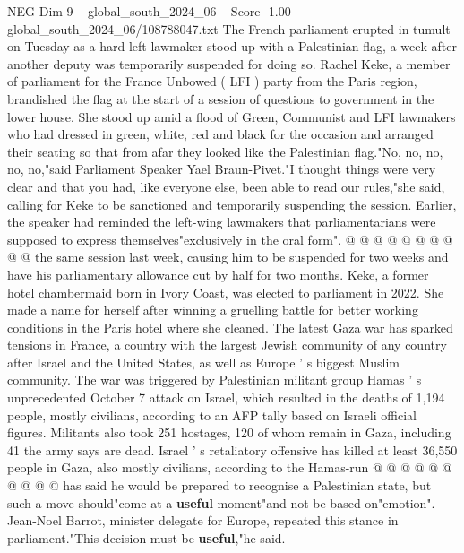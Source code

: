 \begin{textsample}{NEG Dim 9 – global\_south\_2024\_06 – Score -1.00 – global\_south\_2024\_06/108788047.txt}  \label{ex:f9_neg_403}
The French parliament erupted in tumult on Tuesday as a hard-left lawmaker stood up with a Palestinian flag, a week after another deputy was temporarily suspended for doing so.
Rachel Keke, a member of parliament for the France Unbowed ( LFI ) party from the Paris region, brandished the flag at the start of a session of questions to government in the lower house.
She stood up amid a flood of Green, Communist and LFI lawmakers who had dressed in green, white, red and black for the occasion and arranged their seating so that from afar they looked like the Palestinian flag."No, no, no, no, no,"said Parliament Speaker Yael Braun-Pivet."I thought things were very clear and that you had, like everyone else, been able to read our rules,"she said, calling for Keke to be sanctioned and temporarily suspending the session.
Earlier, the speaker had reminded the left-wing lawmakers that parliamentarians were supposed to express themselves"exclusively in the oral form". @ @ @ @ @ @ @ @ @ @ the same session last week, causing him to be suspended for two weeks and have his parliamentary allowance cut by half for two months.
Keke, a former hotel chambermaid born in Ivory Coast, was elected to parliament in 2022.
She made a name for herself after winning a gruelling battle for better working conditions in the Paris hotel where she cleaned.
The latest Gaza war has sparked tensions in France, a country with the largest Jewish community of any country after Israel and the United States, as well as Europe ' s biggest Muslim community.
The war was triggered by Palestinian militant group Hamas ' s unprecedented October 7 attack on Israel, which resulted in the deaths of 1,194 people, mostly civilians, according to an AFP tally based on Israeli official figures.
Militants also took 251 hostages, 120 of whom remain in Gaza, including 41 the army says are dead.
Israel ' s retaliatory offensive has killed at least 36,550 people in Gaza, also mostly civilians, according to the Hamas-run @ @ @ @ @ @ @ @ @ @ has said he would be prepared to recognise a Palestinian state, but such a move should"come at a \textbf{useful} moment"and not be based on"emotion".
Jean-Noel Barrot, minister delegate for Europe, repeated this stance in parliament."This decision must be \textbf{useful},"he said.

\end{textsample}
